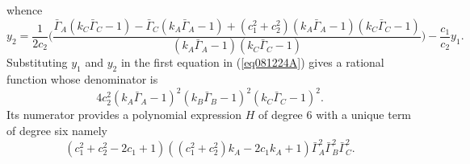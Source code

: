 \documentclass[10pt]{amsart}
\theoremstyle{definition}
\theoremstyle{remark}
\begin{document}
whence
\begin{equation}
\label{eqB151224}
y_2=\frac{1}{2c_2}\Big(\frac{\bar{\Gamma}_A(k_C\bar{\Gamma}_C-1)-\bar{\Gamma}_C(k_A\bar{\Gamma}_A-1)+
(c_1^2+c_2^2)(k_A\bar{\Gamma}_A-1)(k_C\bar{\Gamma}_C-1)}{(k_A\bar{\Gamma}_A-1)(k_C\bar{\Gamma}_C-1)}
\Big)-\frac{c_1}{c_2}y_1.
\end{equation}
Substituting $y_1$ and $y_2$ in the first equation in (\ref{eq081224A}) gives a rational function whose denominator is $$4c_2^2(k_A\bar{\Gamma}_A-1)^2(k_B\bar{\Gamma}_B-1)^2(k_C\bar{\Gamma}_C-1)^2.$$ Its numerator  provides a polynomial expression $H$ of degree $6$ with a unique term of degree six namely 
$$ (c_1^2+c_2^2-2c_1+1)((c_1^2+c_2^2)k_A-2c_1k_A+1)\bar{\Gamma}_A^2\bar{\Gamma}_B^2\bar{\Gamma}_C^2.$$
\end{document}
